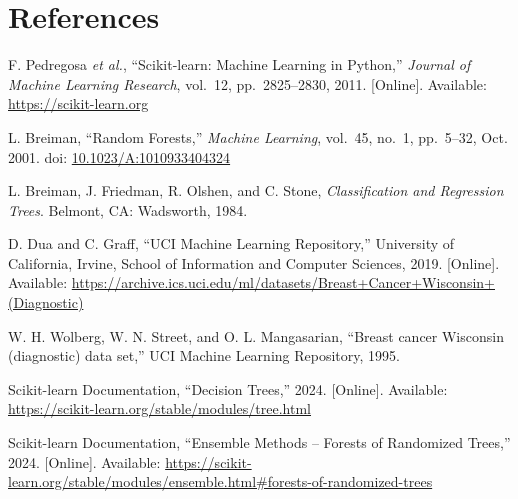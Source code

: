 \documentclass[12pt,a4paper]{article}
\begin{document}
\section{References}

\begin{enumerate}[label={[\arabic*]},leftmargin=*]

\item F. Pedregosa \textit{et al.}, ``Scikit-learn: Machine Learning in Python,''
  \textit{Journal of Machine Learning Research}, vol.\ 12, pp.\ 2825--2830, 2011.
  [Online]. Available: \url{https://scikit-learn.org}

\item L. Breiman, ``Random Forests,'' \textit{Machine Learning}, vol.\ 45, no.\ 1,
  pp.\ 5--32, Oct. 2001.
  doi: \href{https://doi.org/10.1023/A:1010933404324}{10.1023/A:1010933404324}

\item L. Breiman, J. Friedman, R. Olshen, and C. Stone,
  \textit{Classification and Regression Trees}. Belmont, CA: Wadsworth, 1984.

\item D. Dua and C. Graff, ``UCI Machine Learning Repository,''
  University of California, Irvine, School of Information and Computer Sciences, 2019.
  [Online]. Available: \url{https://archive.ics.uci.edu/ml/datasets/Breast+Cancer+Wisconsin+(Diagnostic)}

\item W. H. Wolberg, W. N. Street, and O. L. Mangasarian,
  ``Breast cancer Wisconsin (diagnostic) data set,''
  UCI Machine Learning Repository, 1995.

\item Scikit-learn Documentation, ``Decision Trees,'' 2024.
  [Online]. Available: \url{https://scikit-learn.org/stable/modules/tree.html}

\item Scikit-learn Documentation, ``Ensemble Methods -- Forests of Randomized Trees,'' 2024.
  [Online]. Available:
  \url{https://scikit-learn.org/stable/modules/ensemble.html#forests-of-randomized-trees}

\end{enumerate}
\end{document}

